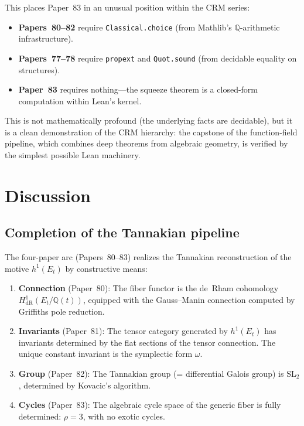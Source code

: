 \documentclass[11pt]{article}
\theoremstyle{plain}
\theoremstyle{definition}
\theoremstyle{remark}
\newcommand{\Q}{\mathbb{Q}}
\newcommand{\SL}{\mathrm{SL}}
\begin{document}
This places Paper~83 in an unusual position within the CRM series:
\begin{itemize}
  \item \textbf{Papers~80--82} require \texttt{Classical.choice} (from Mathlib's $\Q$-arithmetic infrastructure).
  \item \textbf{Papers~77--78} require \texttt{propext} and \texttt{Quot.sound} (from decidable equality on structures).
  \item \textbf{Paper~83} requires nothing---the squeeze theorem is a closed-form computation within Lean's kernel.
\end{itemize}

\noindent
This is not mathematically profound (the underlying facts are decidable), but it is a clean demonstration of the CRM hierarchy: the capstone of the function-field pipeline, which combines deep theorems from algebraic geometry, is verified by the simplest possible Lean machinery.

\section{Discussion}
\label{sec:discussion}

\subsection{Completion of the Tannakian pipeline}

The four-paper arc (Papers~80--83) realizes the Tannakian reconstruction of the motive $h^1(E_t)$ by constructive means:
\begin{enumerate}
  \item \textbf{Connection} (Paper~80): The fiber functor is the de~Rham cohomology $H^1_{\mathrm{dR}}(E_t/\Q(t))$, equipped with the Gauss--Manin connection computed by Griffiths pole reduction.
  \item \textbf{Invariants} (Paper~81): The tensor category generated by $h^1(E_t)$ has invariants determined by the flat sections of the tensor connection.
  The unique constant invariant is the symplectic form $\omega$.
  \item \textbf{Group} (Paper~82): The Tannakian group (= differential Galois group) is $\SL_2$, determined by Kovacic's algorithm.
  \item \textbf{Cycles} (Paper~83): The algebraic cycle space of the generic fiber is fully determined: $\rho = 3$, with no exotic cycles.
\end{enumerate}
\end{document}
